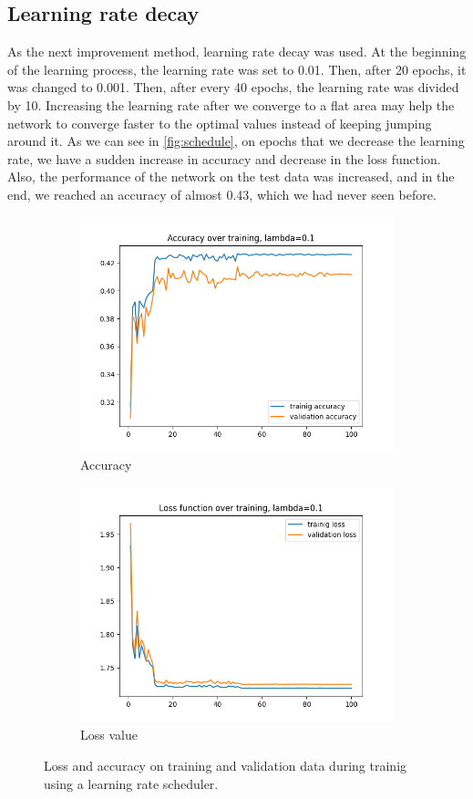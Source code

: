 \documentclass[a4paper]{article}
\begin{document}
\subsection*{Learning rate decay}

As the next improvement method, learning rate decay was used. At the beginning of the learning process, the learning rate was set to 0.01. Then, after 20 epochs, it was changed to 0.001. Then, after every 40 epochs, the learning rate was divided by 10. Increasing the learning rate after we converge to a flat area may help the network to converge faster to the optimal values instead of keeping jumping around it. As we can see in \autoref{fig:schedule}, on epochs that we decrease the learning rate, we have a sudden increase in accuracy and decrease in the loss function. Also, the performance of the network on the test data was increased, and in the end, we reached an accuracy of almost 0.43, which we had never seen before.

\begin{figure}[h]
	\centering
	\begin{subfigure}{\textwidth}
		\centering
		\includegraphics[width=.6\linewidth]{images/scheduled_accuracy_over_trainig_lambda=0.1.png}
	\caption{Accuracy}
	\end{subfigure}
	\begin{subfigure}{\textwidth}
		\centering
		\includegraphics[width=.6\linewidth]{images/scheduled_loss_over_trainig_lambda=0.1.png}
		\caption{Loss value}
	\end{subfigure}

	\caption{Loss and accuracy on training and validation data during trainig using a learning rate scheduler.}
	\label{fig:schedule}
\end{figure}
\end{document}
